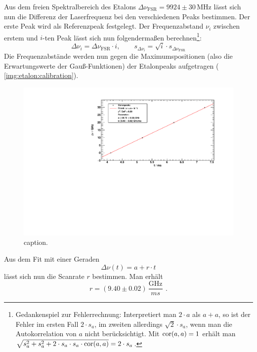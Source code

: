 Aus dem freien Spektralbereich des Etalons $\Delta \nu_\text{FSR} = 9924 \pm 30\,\text{MHz}$ lässt sich nun die Differenz der Laserfrequenz bei den verschiedenen 
Peaks bestimmen. Der erste Peak wird als Referenzpeak festgelegt. Der Frequenzabstand $\nu_i$ zwischen erstem und $i$-ten Peak lässt sich nun 
folgendermaßen berechnen\footnote{Gedankenspiel zur Fehlerrechnung: Interpretiert man $2 \cdot a$ als $a + a$, so ist der Fehler im ersten Fall $2 \cdot s_a$, im zweiten 
allerdings $\sqrt{2} \cdot s_a$, wenn man die Autokorrelation von $a$ nicht berücksichtigt. Mit $\operatorname{cor}(a, a) = 1$ 
erhält man $\sqrt{s_a^2 + s_a^2 + 2 \cdot s_a \cdot s_a \cdot \operatorname{cor}(a, a)} = 2 \cdot s_a$.}: 
\begin{equation}
    \Delta \nu_i = \Delta \nu_\text{FSR} \cdot i, \qquad s_{\Delta \nu_i} = \sqrt{i} \cdot s_{\Delta \nu_\text{FSR}} 
\end{equation}
Die Frequenzabstände werden nun gegen die Maximumspositionen (also die Erwartungswerte der Gauß-Funktionen) der Etalonpeaks aufgetragen ( \autoref{img:etalon:calibration}).
\begin{figure}[H]
\begin{center}
  \includegraphics[width=\textwidth]{../img/part2/up-etalon_zoom-etalon_calibration.pdf}
  \caption{caption.}
  \label{img:etalon:calibration}
\end{center}
\end{figure}
Aus dem Fit mit einer Geraden 
\begin{equation}
    \Delta \nu(t) = a + r \cdot t  %
\end{equation}
lässt sich nun die Scanrate $r$ bestimmen. Man erhält %
\begin{equation}
    r = (9.40 \pm 0.02)\,\frac{\text{GHz}}{ms}\ \, .
\end{equation}

